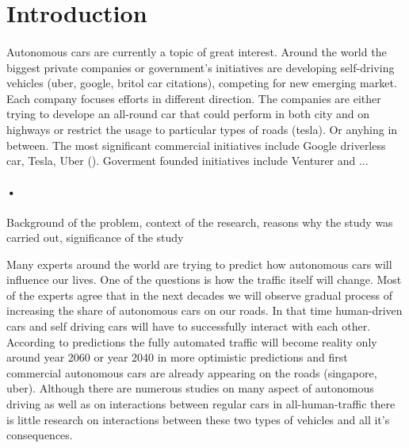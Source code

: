 \documentclass[11pt]{article}
\begin{document}

\tableofcontents %

\newpage %



\section{Introduction} %
\paragraph{}
Autonomous cars are currently a topic of great interest. Around the world the biggest private companies or government’s initiatives are developing self-driving vehicles (uber, google, britol car citations), competing for new emerging market. Each company focuses efforts in different direction. The companies are either trying to develope an all-round car that could perform in both city and on highways or restrict the usage to particular types of roads (tesla). Or anyhing in between. The most significant commercial initiatives include Google driverless car, Tesla, Uber (). Goverment founded initiatives include Venturer and ...


\paragraph{•}
Background of the problem, context of the research, reasons why the study was carried out, significance of the study



Many experts around the world are trying to predict how autonomous cars will influence our lives. One of the questions is how the traffic itself will change. Most of the experts agree that in the next decades we will observe gradual process of increasing the share of autonomous cars on our roads. In that time human-driven cars and self driving cars will have to successfully interact with each other. According to predictions the fully automated traffic will become reality only around year 2060 or year 2040 in more optimistic predictions and first commercial autonomous cars are already appearing on the roads (singapore, uber). Although there are numerous studies on many aspect of autonomous driving as well as on interactions between regular cars in all-human-traffic there is little research on interactions between these two types of vehicles and all it’s consequences.
\end{document}
